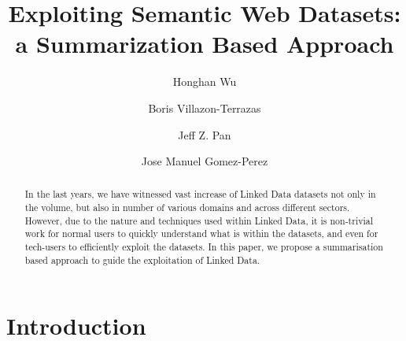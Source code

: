 \documentclass{llncs}
\begin{document}
%
\frontmatter          %
%
\pagestyle{headings}  %
%
%
\mainmatter              %
%
\title{Exploiting Semantic Web Datasets: a Summarization Based Approach}

%
%
\author{Honghan Wu \and Boris Villazon-Terrazas \and Jeff Z. Pan \and Jose Manuel Gomez-Perez}
%
%
%


\maketitle              %



\begin{abstract}
In the last years, we have witnessed vast increase of Linked Data datasets not only in the volume, but also in number of various domains and across different sectors. However, due to the nature and techniques used within Linked Data, it is non-trivial work for normal users to quickly understand what is within the datasets, and even for tech-users to efficiently exploit the datasets. In this paper, we propose a summarisation based approach to guide the exploitation of Linked Data. 
\end{abstract}

\vspace{-8mm}
\section{Introduction}\label{sec:Introduction}

\vspace{-8mm}
\end{document}
